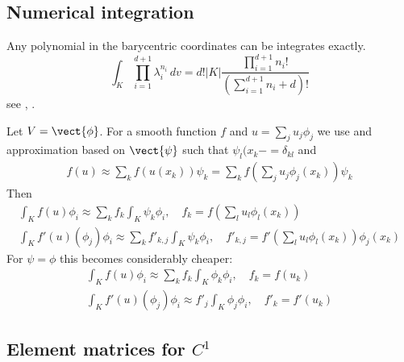 \documentclass[11pt]{article}
\begin{document}
%
\subsection{Numerical integration}\label{subsec:}
%
Any polynomial in the barycentric coordinates can be integrates exactly.
%
\begin{equation}\label{eq:}
\int_K \prod_{i=1}^{d+1}\lambda_i^{n_i} \,dv = d!|K|\frac{\prod\limits_{i=1}^{d+1} n_i!}{\left( \sum\limits_{i=1}^{d+1} n_i + d\right)!}
\end{equation}
%
see \cite{EisenbergMalvern73}, \cite{VermolenSegal18}.
%

Let $V=\vect{\phi}$. For a smooth function $f$ and $u=\sum_j u_j \phi_j$ we use and approximation based on $\vect{\psi}$ such that $\psi_l(x_k-=\delta_{kl}$ and
%
\begin{align*}
f(u) \approx \sum_k f(u(x_k))\psi_k = \sum_k f(\sum_j u_j \phi_j(x_k))\psi_k
\end{align*}
%
Then
%
\begin{align*}
\int_K f(u) \phi_i \approx \sum_k f_k\int_K \psi_k\phi_i,\quad f_k = f(\sum_l u_l \phi_l(x_k))\\ 
\int_K f'(u)(\phi_j) \phi_i \approx \sum_k f'_{k,j}\int_K  \psi_k\phi_i,\quad f'_{k,j} = f'(\sum_l u_l \phi_l(x_k))\phi_j(x_k)
\end{align*}
%
For $\psi=\phi$ this becomes considerably cheaper:
%
\begin{align*}
\int_K f(u) \phi_i \approx \sum_k f_k\int_K \phi_k\phi_i,\quad f_k = f(u_k)\\ 
\int_K f'(u)(\phi_j) \phi_i \approx f'_j\int_K  \phi_j \phi_i,\quad f'_k = f'(u_k)
\end{align*}
%


%
\subsection{Element matrices for $C^1$}\label{subsec:}
%
%
\end{document}
